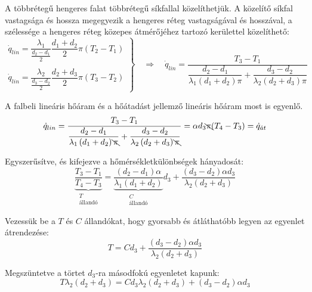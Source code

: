 A többrétegű hengeres falat többrétegű síkfallal közelíthetjük. A közelítő síkfal vastagsága és hossza megegyezik a hengeres réteg vastagságával és hosszával, a szélessége a hengeres réteg közepes átmérőjéhez tartozó kerülettel közelíthető:
\begin{equation}
	\left.
	\begin{array}{l}
		\dot{q}_{lin} = \dfrac{\lambda_1}{\frac{d_2-d_1}{2}} \dfrac{d_1+d_2}{2} \pi (T_2 - T_1) \\ \\
		\dot{q}_{lin} = \dfrac{\lambda_2}{\frac{d_3-d_2}{2}} \dfrac{d_2+d_3}{2} \pi (T_3 - T_2)
	\end{array}
	\right\rbrace
	\quad \Rightarrow \quad 
	\dot{q}_{lin} = \dfrac{T_3 - T_1}{
		\dfrac{d_2-d_1}{\lambda_1\left(d_1+d_2\right) \pi} + 
		\dfrac{d_3-d_2}{\lambda_2\left(d_2+d_3\right) \pi}
		}
\end{equation}

A falbeli lineáris hőáram és a hőátadást jellemző lineáris hőáram most is egyenlő. 
\begin{equation}
	\dot{q}_{lin} = \dfrac{T_3 - T_1}{
		\dfrac{d_2-d_1}{\lambda_1\left(d_1+d_2\right) \bcancel{\pi}} + 
		\dfrac{d_3-d_2}{\lambda_2\left(d_2+d_3\right)\bcancel{\pi}}
		}
	= 
	\alpha d_3 \bcancel{\pi} (T_4 - T_3) = \dot{q}_{\acute{a}t}
\end{equation}

Egyszerűsítve, és kifejezve a hőmérsékletkülönbségek hányadosát:
\begin{equation}
	\underbrace{\dfrac{T_3 - T_1}{T_4 - T_3}}_{\substack{T \\ \text{állandó}}}
	= 
	\underbrace{\dfrac{\left(d_2-d_1\right)\alpha}{\lambda_1\left(d_1+d_2\right)}}_{\substack{C \\ \text{állandó}}} d_3
	+ 
	\dfrac{\left(d_3-d_2\right) \alpha d_3}{\lambda_2\left(d_2+d_3\right)}
\end{equation}

Vezessük be a $T$ és $C$ állandókat, hogy gyorsabb és átláthatóbb legyen az egyenlet átrendezése:
\begin{equation}
	T = C d_3 +  \dfrac{\left(d_3-d_2\right) \alpha d_3}{\lambda_2\left(d_2+d_3\right)}
\end{equation}

Megszüntetve a törtet $d_3$-ra másodfokú egyenletet kapunk:
\begin{equation}
	T \lambda_2\left(d_2+d_3\right) = C d_3 \lambda_2\left(d_2+d_3\right) + \left(d_3-d_2\right) \alpha d_3
\end{equation}

